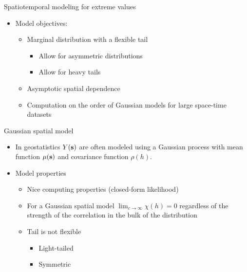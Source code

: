 \documentclass{beamer}
\begin{document}
\begin{frame}{Spatiotemporal modeling for extreme values}
  \begin{itemize} \setlength{\itemsep}{1em}
    \item Model objectives:
    \begin{itemize}
      \item Marginal distribution with a flexible tail
      \begin{itemize}
        \item Allow for asymmetric distributions
        \item Allow for heavy tails
      \end{itemize}
      \item Asymptotic spatial dependence
      \item Computation on the order of Gaussian models for large space-time datasets
    \end{itemize}
  \end{itemize}
\end{frame}

\begin{frame}{Gaussian spatial model}
  \begin{itemize} \setlength{\itemsep}{1em}
    \item In geostatistics $Y(\mbox{\bf s})$ are often modeled using a Gaussian process with mean function $\mu(\mbox{\bf s})$ and covariance function $\rho(h)$.
    \item Model properties
    \begin{itemize}
      \item Nice computing properties (closed-form likelihood)
      \item For a Gaussian spatial model $\lim_{c \rightarrow \infty} \chi(h) = 0$ regardless of the strength of the correlation in the bulk of the distribution
      \item Tail is not flexible
      \begin{itemize}
        \item Light-tailed
        \item Symmetric
      \end{itemize}
    \end{itemize}
  \end{itemize}
\end{frame}
\end{document}
